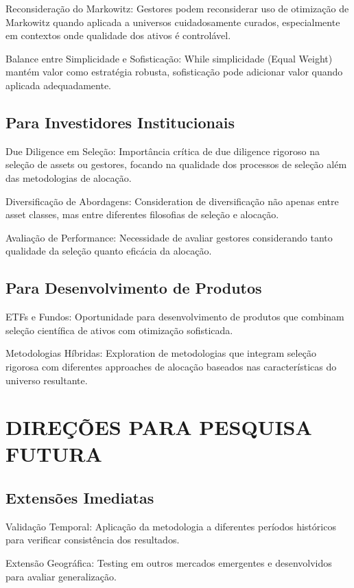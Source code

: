 Reconsideração do Markowitz: Gestores podem reconsiderar uso de otimização de Markowitz quando aplicada a universos cuidadosamente curados, especialmente em contextos onde qualidade dos ativos é controlável.

Balance entre Simplicidade e Sofisticação: While simplicidade (Equal Weight) mantém valor como estratégia robusta, sofisticação pode adicionar valor quando aplicada adequadamente.

\subsection{Para Investidores Institucionais}

Due Diligence em Seleção: Importância crítica de due diligence rigoroso na seleção de assets ou gestores, focando na qualidade dos processos de seleção além das metodologias de alocação.

Diversificação de Abordagens: Consideration de diversificação não apenas entre asset classes, mas entre diferentes filosofias de seleção e alocação.

Avaliação de Performance: Necessidade de avaliar gestores considerando tanto qualidade da seleção quanto eficácia da alocação.

\subsection{Para Desenvolvimento de Produtos}

ETFs e Fundos: Oportunidade para desenvolvimento de produtos que combinam seleção científica de ativos com otimização sofisticada.

Metodologias Híbridas: Exploration de metodologias que integram seleção rigorosa com diferentes approaches de alocação baseados nas características do universo resultante.

\section{DIREÇÕES PARA PESQUISA FUTURA}

\subsection{Extensões Imediatas}

Validação Temporal: Aplicação da metodologia a diferentes períodos históricos para verificar consistência dos resultados.

Extensão Geográfica: Testing em outros mercados emergentes e desenvolvidos para avaliar generalização.

